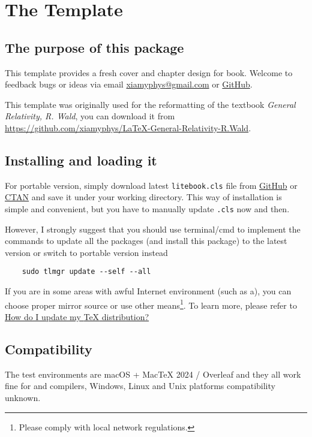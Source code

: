 \chapter{The  Template}

\section{The purpose of this package}
This template provides a fresh cover and chapter design for book. Welcome to feedback bugs or ideas via email \href{mailto:xiamyphys@gmail.com}{\ttfamily xiamyphys@gmail.com} or \href{https://github.com/xiamyphys/litebook}{GitHub}.

This template was originally used for the reformatting of the textbook \emph{General Relativity, R. Wald}, you can download it from \url{https://github.com/xiamyphys/LaTeX-General-Relativity-R.Wald}.

\section{Installing  and loading it}
For portable version, simply download latest \verb|litebook.cls| file from \href{https://github.com/xiamyphys/LiteBook}{GitHub} or \href{https://ctan.org/pkg/litebook}{CTAN} and save it under your working directory. This way of installation is simple and convenient, but you have to manually update \verb|.cls| now and then.

However, I strongly suggest that you should use terminal/cmd to implement the commands to update all the packages (and install this package) to the latest version or switch to portable version instead
\begin{verbatim}
    sudo tlmgr update --self --all
\end{verbatim}

If you are in some areas with awful Internet environment (such as a), you can choose proper mirror source or use other means\footnote{Please comply with local network regulations.}. To learn more, please refer to \href{https://tex.stackexchange.com/questions/55437/how-do-i-update-my-tex-distribution}{How do I update my \textsf{\TeX} distribution?}

\section{Compatibility}
The test environments are macOS + Mac\TeX{} 2024 / Overleaf and they all work fine for  and  compilers, Windows, Linux and Unix platforms compatibility unknown.


